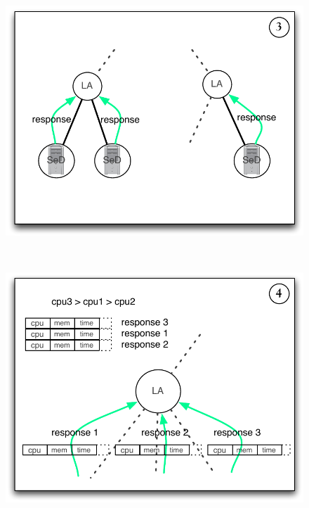 \begin{figure}[h]
\begin{minipage}{\schdlFigWidth}
    \includegraphics[width=\schdlFigWidth]{fig/schdl02}
  \end{minipage}\\
  \begin{minipage}{\schdlFigWidth}
    \includegraphics[width=\schdlFigWidth]{fig/schdl03}
  \end{minipage}
  \begin{minipage}{\schdlFigWidth}

\end{minipage}
\end{figure}
